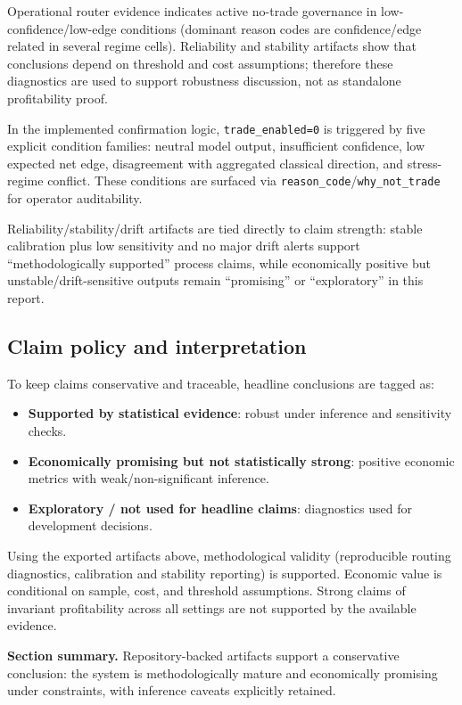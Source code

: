\documentclass[a4paper,12pt]{extarticle}
\begin{document}
Operational router evidence indicates active no-trade governance in low-confidence/low-edge conditions (dominant reason codes are confidence/edge related in several regime cells). Reliability and stability artifacts show that conclusions depend on threshold and cost assumptions; therefore these diagnostics are used to support robustness discussion, not as standalone profitability proof.

In the implemented confirmation logic, \texttt{trade\_enabled=0} is triggered by five explicit condition families: neutral model output, insufficient confidence, low expected net edge, disagreement with aggregated classical direction, and stress-regime conflict. These conditions are surfaced via \texttt{reason\_code}/\texttt{why\_not\_trade} for operator auditability.

Reliability/stability/drift artifacts are tied directly to claim strength: stable calibration plus low sensitivity and no major drift alerts support ``methodologically supported'' process claims, while economically positive but unstable/drift-sensitive outputs remain ``promising'' or ``exploratory'' in this report.

\subsection{Claim policy and interpretation}

To keep claims conservative and traceable, headline conclusions are tagged as:
\begin{itemize}
    \item \textbf{Supported by statistical evidence}: robust under inference and sensitivity checks.
    \item \textbf{Economically promising but not statistically strong}: positive economic metrics with weak/non-significant inference.
    \item \textbf{Exploratory / not used for headline claims}: diagnostics used for development decisions.
\end{itemize}

Using the exported artifacts above, methodological validity (reproducible routing diagnostics, calibration and stability reporting) is supported. Economic value is conditional on sample, cost, and threshold assumptions. Strong claims of invariant profitability across all settings are not supported by the available evidence.

\textbf{Section summary.} Repository-backed artifacts support a conservative conclusion: the system is methodologically mature and economically promising under constraints, with inference caveats explicitly retained.
\end{document}
